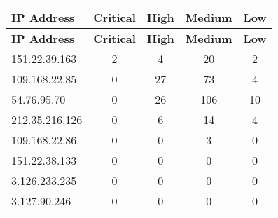 \documentclass{article}
\begin{document}
\begin{longtable}{|>{\raggedright\arraybackslash}p{3cm}|c|c|c|c|}
    \hline
    \textbf{IP Address} & \textbf{Critical} & \textbf{High} & \textbf{Medium} & \textbf{Low} \\
    \hline
    \endfirsthead
    \hline
    \textbf{IP Address} & \textbf{Critical} & \textbf{High} & \textbf{Medium} & \textbf{Low} \\
    \hline
    \endhead
    \hline
    \endfoot
    \endlastfoot
    
    
    
    \rowcolor{lightred} %
    
    151.22.39.163 & 2 & 4 & 20 & 2 \\
    \hline
    
    
    \rowcolor{lightred} %
    
    109.168.22.85 & 0 & 27 & 73 & 4 \\
    \hline
    
    
    \rowcolor{lightred} %
    
    54.76.95.70 & 0 & 26 & 106 & 10 \\
    \hline
    
    
    \rowcolor{lightred} %
    
    212.35.216.126 & 0 & 6 & 14 & 4 \\
    \hline
    
    
    \rowcolor{lightyellow} %
    
    109.168.22.86 & 0 & 0 & 3 & 0 \\
    \hline
    
    
    \rowcolor{lightgreen} %
    
    151.22.38.133 & 0 & 0 & 0 & 0 \\
    \hline
    
    
    \rowcolor{lightgreen} %
    
    3.126.233.235 & 0 & 0 & 0 & 0 \\
    \hline
    
    
    \rowcolor{lightgreen} %
    
    3.127.90.246 & 0 & 0 & 0 & 0 \\
    \hline
    

\end{longtable}
\end{document}
